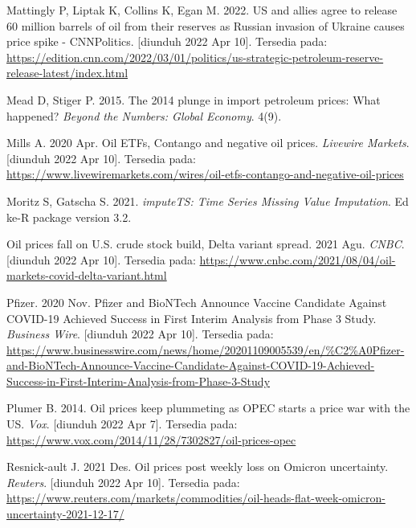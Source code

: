\documentclass[
]{book}
\newlength{\cslhangindent}
\newlength{\cslentryspacingunit} %
\newenvironment{CSLReferences}[2] %
 {%
  \setlength{\parindent}{0pt}
  \ifodd #1
  \let\oldpar\par
  \def\par{\hangindent=\cslhangindent\oldpar}
  \fi
  \setlength{\parskip}{#2\cslentryspacingunit}
 }%
 {}
\begin{document}
\begin{CSLReferences}{0}{0}
\leavevmode{}%
Mattingly P, Liptak K, Collins K, Egan M. 2022. {US} and allies agree to release 60 million barrels of oil from their reserves as {Russian} invasion of {Ukraine} causes price spike - {CNNPolitics}. {[}diunduh 2022 Apr 10{]}. Tersedia pada: \url{https://edition.cnn.com/2022/03/01/politics/us-strategic-petroleum-reserve-release-latest/index.html}

\leavevmode{}%
Mead D, Stiger P. 2015. The 2014 plunge in import petroleum prices: {What} happened? \emph{Beyond the Numbers: Global Economy}. 4(9).

\leavevmode{}%
Mills A. 2020 Apr. Oil {ETFs}, {Contango} and negative oil prices. \emph{Livewire Markets}. {[}diunduh 2022 Apr 10{]}. Tersedia pada: \url{https://www.livewiremarkets.com/wires/oil-etfs-contango-and-negative-oil-prices}

\leavevmode{}%
Moritz S, Gatscha S. 2021. \emph{imputeTS: Time Series Missing Value Imputation}. Ed ke-R package version 3.2.

\leavevmode{}%
Oil prices fall on {U}.{S}. crude stock build, {Delta} variant spread. 2021 Agu. \emph{CNBC}. {[}diunduh 2022 Apr 10{]}. Tersedia pada: \url{https://www.cnbc.com/2021/08/04/oil-markets-covid-delta-variant.html}

\leavevmode{}%
Pfizer. 2020 Nov. Pfizer and {BioNTech} {Announce} {Vaccine} {Candidate} {Against} {COVID}-19 {Achieved} {Success} in {First} {Interim} {Analysis} from {Phase} 3 {Study}. \emph{Business Wire}. {[}diunduh 2022 Apr 10{]}. Tersedia pada: \url{https://www.businesswire.com/news/home/20201109005539/en/\%C2\%A0Pfizer-and-BioNTech-Announce-Vaccine-Candidate-Against-COVID-19-Achieved-Success-in-First-Interim-Analysis-from-Phase-3-Study}

\leavevmode{}%
Plumer B. 2014. Oil prices keep plummeting as {OPEC} starts a price war with the {US}. \emph{Vox}. {[}diunduh 2022 Apr 7{]}. Tersedia pada: \url{https://www.vox.com/2014/11/28/7302827/oil-prices-opec}

\leavevmode{}%
Resnick-ault J. 2021 Des. Oil prices post weekly loss on {Omicron} uncertainty. \emph{Reuters}. {[}diunduh 2022 Apr 10{]}. Tersedia pada: \url{https://www.reuters.com/markets/commodities/oil-heads-flat-week-omicron-uncertainty-2021-12-17/}


\end{CSLReferences}
\end{document}

